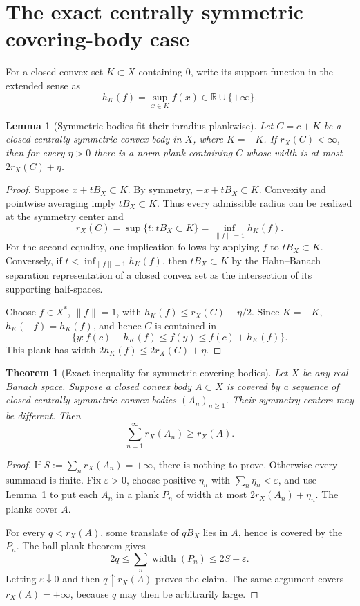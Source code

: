 \documentclass[11pt]{article}
\newtheorem{theorem}{Theorem}
\newtheorem{lemma}{Lemma}
\theoremstyle{remark}
\newcommand{\R}{\mathbb{R}}
\newcommand{\Ball}{B_X}
\newcommand{\rin}{r_X}
\begin{document}
\section{The exact centrally symmetric covering-body case}

For a closed convex set \(K\subset X\) containing \(0\), write its support
function in the extended sense as
\[
  h_K(f)=\sup_{x\in K} f(x)\in\R\cup\{+\infty\}.
\]

\begin{lemma}[Symmetric bodies fit their inradius plankwise]
\label{lem:symmetric-plank}
Let \(C=c+K\) be a closed centrally symmetric convex body in \(X\), where
\(K=-K\). If \(\rin(C)<\infty\), then for every \(\eta>0\) there is a norm
plank containing \(C\) whose width is at most \(2\rin(C)+\eta\).
\end{lemma}

\begin{proof}
Suppose \(x+t\Ball\subset K\). By symmetry,
\(-x+t\Ball\subset K\). Convexity and pointwise averaging imply
\(t\Ball\subset K\). Thus every admissible radius can be realized at the
symmetry center and
\[
  \rin(C)=\sup\{t:t\Ball\subset K\}
          =\inf_{\|f\|=1}h_K(f).
\]
For the second equality, one implication follows by applying \(f\) to
\(t\Ball\subset K\). Conversely, if
\(t<\inf_{\|f\|=1}h_K(f)\), then \(t\Ball\subset K\) by the Hahn--Banach
separation representation of a closed convex set as the intersection of its
supporting half-spaces.

Choose \(f\in X^*\), \(\|f\|=1\), with
\(h_K(f)\le\rin(C)+\eta/2\). Since \(K=-K\),
\(h_K(-f)=h_K(f)\), and hence \(C\) is contained in
\[
  \{y:f(c)-h_K(f)\le f(y)\le f(c)+h_K(f)\}.
\]
This plank has width \(2h_K(f)\le2\rin(C)+\eta\).
\end{proof}

\begin{theorem}[Exact inequality for symmetric covering bodies]
\label{thm:symmetric}
Let \(X\) be any real Banach space. Suppose a closed convex body \(A\subset X\)
is covered by a sequence of closed centrally symmetric convex bodies
\((A_n)_{n\ge1}\). Their symmetry centers may be different. Then
\[
  \sum_{n=1}^{\infty}\rin(A_n)\ge\rin(A).
\]
\end{theorem}

\begin{proof}
If \(S:=\sum_n\rin(A_n)=+\infty\), there is nothing to prove. Otherwise every
summand is finite. Fix \(\varepsilon>0\), choose positive \(\eta_n\) with
\(\sum_n\eta_n<\varepsilon\), and use Lemma~\ref{lem:symmetric-plank} to put
each \(A_n\) in a plank \(P_n\) of width at most
\(2\rin(A_n)+\eta_n\). The planks cover \(A\).

For every \(q<\rin(A)\), some translate of \(q\Ball\) lies in \(A\), hence is
covered by the \(P_n\). The ball plank theorem gives
\[
  2q\le\sum_n \operatorname{width}(P_n)
      \le 2S+\varepsilon.
\]
Letting \(\varepsilon\downarrow0\) and then \(q\uparrow\rin(A)\) proves the
claim. The same argument covers \(\rin(A)=+\infty\), because \(q\) may then
be arbitrarily large.
\end{proof}
\end{document}
